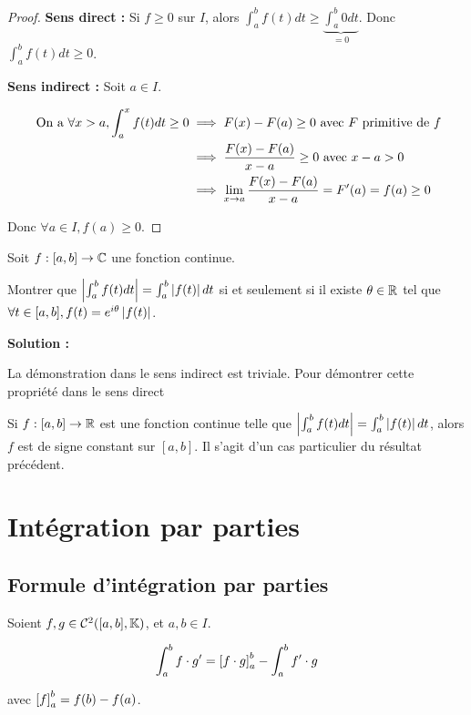 \documentclass[12pt, a4paper]{report}
\begin{document}
\begin{proof}
    \textbf{Sens direct :} Si $f\ge 0$ sur $I$, alors $\int_a^b f(t)dt \ge \underbrace{\int_a^b 0 dt}_{=0}$. Donc $\int_a^b f(t)dt \ge 0$.

    \textbf{Sens indirect :} Soit $a \in I$.

    \begin{align*}
        \text{ On a } \forall x > a, \int_a^x f(t)dt \ge 0 &\implies F(x) - F(a) \ge 0 \text{ avec } F \text{ primitive de } f\\
        &\implies \frac{F(x) - F(a)}{x-a} \ge 0 \text{ avec } x-a>0\\
        &\implies \lim_{x\to a} \frac{F(x) - F(a)}{x-a} = F'(a) = f(a) \ge 0
    \end{align*}

    Donc $\forall a \in I, f(a) \ge 0$.
\end{proof}

\begin{exercise}
    Soit $f:[a,b]\to\mathbb{C}$ une fonction continue.

    Montrer que $\left|\int_a^b f(t) dt\right| = \int_a^b \left|f(t)\right| dt$ si et seulement si il existe $\theta \in \mathbb{R}$ tel que $\forall t \in [a,b], f(t) = e^{i\theta} \left|f(t)\right|$.

    \textbf{Solution :}

    \begin{outline}
        \1[$\leftarrow$] La démonstration dans le sens indirect est triviale.
        \1[$\rightarrow$] Pour démontrer cette propriété dans le sens direct
    \end{outline}
\end{exercise}

\begin{remark}
    Si $f:[a,b]\to\mathbb{R}$ est une fonction continue telle que $\left|\int_a^b f(t) dt\right| = \int_a^b \left|f(t)\right| dt$, alors $f$ est de signe constant sur $[a,b]$. Il s'agit d'un cas particulier du résultat précédent.
\end{remark}

\section{Intégration par parties}

\subsection{Formule d'intégration par parties}

\begin{theorem}
    Soient $f,g\in\mathcal{C}^2([a,b],\mathbb{K})$, et $a,b\in I$.

    $$\int_a^b f\cdot g' = \left[f\cdot g\right]_a^b - \int_a^b f'\cdot g$$

    avec $\left[f\right]_a^b = f(b) - f(a)$.
\end{theorem}
\end{document}
